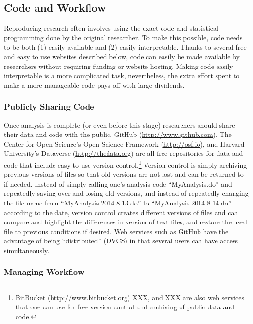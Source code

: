 \documentclass[12pt] {article}
\begin{document}
\subsection{Code and Workflow}\label{code-and-workflow}

Reproducing research often involves using the exact code and statistical
programming done by the original researcher. To make this possible, code
needs to be both (1) easily available and (2) easily interpretable.
Thanks to several free and easy to use websites described below, code
can easily be made available by researchers without requiring funding or
website hosting. Making code easily interpretable is a more complicated
task, nevertheless, the extra effort spent to make a more manageable
code pays off with large dividends.

\subsubsection{Publicly Sharing Code}\label{publicly-sharing-code}

Once analysis is complete (or even before this stage) researchers should
share their data and code with the public. GitHub
(\url{http://www.github.com}), The Center for Open Science's Open
Science Framework (\url{http://osf.io}), and Harvard University's
Dataverse (\url{http://thedata.org}) are all free repositories for data
and code that include easy to use version control.\footnote{BitBucket
  (\href{styles.xml}{http://www.bitbucket.org}) XXX, and XXX are also
  web services that one can use for free version control and archiving
  of public data and code.} Version control is simply archiving previous
versions of files so that old versions are not lost and can be returned
to if needed. Instead of simply calling one's analysis code
``MyAnalysis.do'' and repeatedly saving over and losing old versions,
and instead of repeatedly changing the file name from
``MyAnalysis.2014.8.13.do'' to ``MyAnalysis.2014.8.14.do'' according to
the date, version control creates different versions of files and can
compare and highlight the differences in version of text files, and
restore the used file to previous conditions if desired. Web services
such as GitHub have the advantage of being ``distributed'' (DVCS) in
that several users can have access simultaneously.

\subsubsection{Managing Workflow}\label{managing-workflow}
\end{document}
